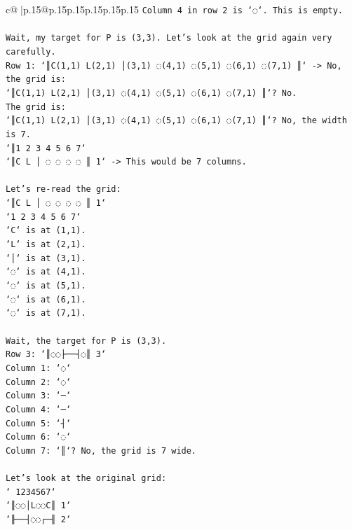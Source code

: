 \documentclass{article}
\begin{document}
{\begin{supertabular}{c@{$\;$}|p{.15\linewidth}@{}p{.15\linewidth}p{.15\linewidth}p{.15\linewidth}p{.15\linewidth}p{.15\linewidth}}
{{{\texttt{Column 4 in row 2 is `◌`. This is empty.} \\
\\ 
\texttt{Wait, my target for P is (3,3). Let's look at the grid again very carefully.} \\
\texttt{Row 1: `║C(1,1) L(2,1) │(3,1) ◌(4,1) ◌(5,1) ◌(6,1) ◌(7,1) ║` {-}> No, the grid is:} \\
\texttt{`║C(1,1) L(2,1) │(3,1) ◌(4,1) ◌(5,1) ◌(6,1) ◌(7,1) ║`? No.} \\
\texttt{The grid is:} \\
\texttt{`║C(1,1) L(2,1) │(3,1) ◌(4,1) ◌(5,1) ◌(6,1) ◌(7,1) ║`? No, the width is 7.} \\
\texttt{`║1 2 3 4 5 6 7`} \\
\texttt{`║C L │ ◌ ◌ ◌ ◌ ║ 1` {-}> This would be 7 columns.} \\
\\ 
\texttt{Let's re{-}read the grid:} \\
\texttt{`║C L │ ◌ ◌ ◌ ◌ ║ 1`} \\
\texttt{`1 2 3 4 5 6 7`} \\
\texttt{`C` is at (1,1).} \\
\texttt{`L` is at (2,1).} \\
\texttt{`│` is at (3,1).} \\
\texttt{`◌` is at (4,1).} \\
\texttt{`◌` is at (5,1).} \\
\texttt{`◌` is at (6,1).} \\
\texttt{`◌` is at (7,1).} \\
\\ 
\texttt{Wait, the target for P is (3,3).} \\
\texttt{Row 3: `║◌◌├──┤◌║ 3`} \\
\texttt{Column 1: `◌`} \\
\texttt{Column 2: `◌`} \\
\texttt{Column 3: `─`} \\
\texttt{Column 4: `─`} \\
\texttt{Column 5: `┤`} \\
\texttt{Column 6: `◌`} \\
\texttt{Column 7: `║`? No, the grid is 7 wide.} \\
\\ 
\texttt{Let's look at the original grid:} \\
\texttt{` 1234567`} \\
\texttt{`║◌◌│L◌◌C║ 1`} \\
\texttt{`╟──┤◌◌┌─╢ 2`} \\
}}}
\end{supertabular}}
\end{document}
